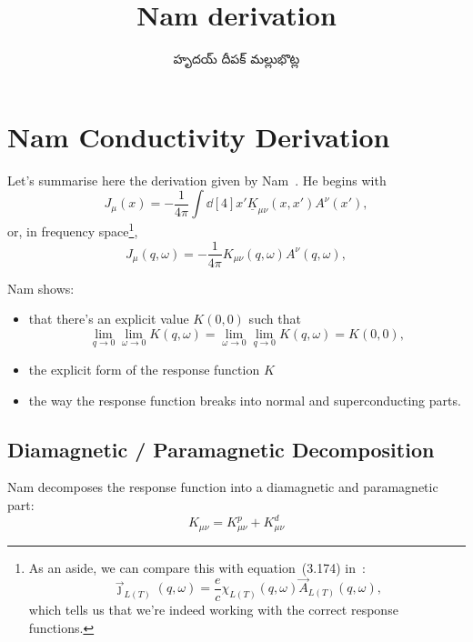 \documentclass[../main.tex]{subfiles}
\title{Nam derivation}
\author{\begin{telugu}హృదయ్ దీపక్ మల్లుభొట్ల\end{telugu}}
\date{}
\begin{document}
	\onlyinsubfile{\maketitle}
	\section{Nam Conductivity Derivation} \label{sec:Nam}
	Let's summarise here the derivation given by Nam~\autocite{Nam1967}.
	He begins with
	\begin{equation}
		J_\mu(x) = - \frac{1}{4\pi}\int \dd[4]{x'} \underline{K}_{\mu\nu}(x, x') A^\nu(x'),
	\end{equation}
	or, in frequency space\footnote{
		As an aside, we can compare this with equation~(3.174) in~\cite{Giuliani2005}:
		\begin{equation*}
			\vec{\jmath}_{L(T)}(q, \omega) = \frac{e}{c} \chi_{L(T)}(q, \omega) \vec{A}_{L(T)}(q, \omega),
		\end{equation*}
		which tells us that we're indeed working with the correct response functions.
	},
	\begin{equation}
		J_\mu(q, \omega) = - \frac{1}{4\pi} K_{\mu\nu}(q, \omega) A^\nu(q, \omega),
	\end{equation}

	Nam shows:
	\begin{itemize}
		\item that there's an explicit value $K(0, 0)$ such that
			\begin{equation}
				\lim_{q \rightarrow 0} \lim_{\omega \rightarrow 0} K(q, \omega) = \lim_{\omega \rightarrow 0} \lim_{q \rightarrow 0} K(q, \omega) = K(0, 0),
			\end{equation}
		\item the explicit form of the response function $K$
		\item the way the response function breaks into normal and superconducting parts.
	\end{itemize}

	\subsection{Diamagnetic / Paramagnetic Decomposition} \label{subsec:diaparamag}

	Nam decomposes the response function into a diamagnetic and paramagnetic part:
	\begin{equation}
		K_{\mu\nu} = K_{\mu\nu}^p + K_{\mu\nu}^d
	\end{equation}
\end{document}
